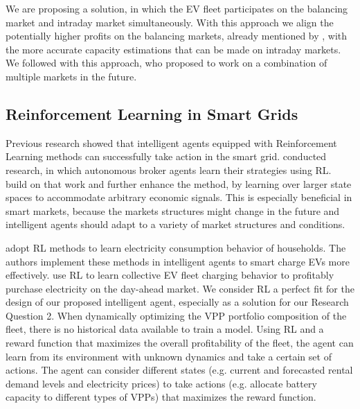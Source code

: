 \documentclass[12pt, article]{article}
\begin{document}
We are proposing a solution, in which the EV fleet participates on the balancing
market and intraday market simultaneously. With this approach we align the
potentially higher profits on the balancing markets, already mentioned by
\textcite{tomic07_using_fleet_elect_drive_vehic_grid_suppor}, with the more
accurate capacity estimations that can be made on intraday markets. We followed
\textcite{kahlen17_fleet} with this approach, who proposed to work on a combination
of multiple markets in the future.

\subsection{Reinforcement Learning in Smart Grids}
\label{sec:org7e5e9fe}

Previous research showed that intelligent agents equipped with Reinforcement
Learning methods can successfully take action in the smart grid.
\textcite{reddy11_strat,reddy11_learn_behav_multip_auton_agent} conducted
research, in which autonomous broker agents \parencite{ketter13_power_tac} learn
their strategies using RL. \textcite{peters13_reinf_learn_approac_to_auton} build
on that work and further enhance the method, by learning over larger state
spaces to accommodate arbitrary economic signals. This is especially beneficial
in smart markets, because the markets structures might change in the future and
intelligent agents should adapt to a variety of market structures and
conditions.

\parencite{vazquez-canteli19_reinf_learn_deman_respon}


\textcite{valogianni14_effec_manag_elect_vehic_storag} adopt RL methods to learn
electricity consumption behavior of households. The authors implement these
methods in intelligent agents to smart charge EVs more effectively.
\textcite{vandael15_reinf_learn_heuris_ev_fleet} use RL to learn collective EV
fleet charging behavior to profitably purchase electricity on the day-ahead
market. We consider RL a perfect fit for the design of our proposed intelligent
agent, especially as a solution for our Research Question 2. When dynamically
optimizing the VPP portfolio composition of the fleet, there is no historical
data available to train a model. Using RL and a reward function that maximizes
the overall profitability of the fleet, the agent can learn from its environment
with unknown dynamics and take a certain set of actions. The agent can consider
different states (e.g. current and forecasted rental demand levels and
electricity prices) to take actions (e.g. allocate battery capacity to different
types of VPPs) that maximizes the reward function.
\end{document}
